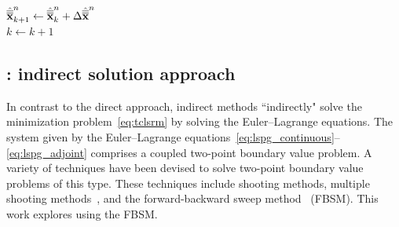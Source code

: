 \begin{algorithm}
{$\hat{\overline{\overline{\mathbf {x}}}}^{n}_{k+1} \leftarrow \hat{\overline{\overline{\mathbf {x}}}}^{n}_k + \Delta \hat{\overline{\overline{\mathbf {x}}}}^{n}$  \\
$k\leftarrow k+1$
}
\end{algorithm}


%

\subsection{\spatialAcronym: indirect solution approach}\label{sec:indirect}
In contrast to the direct approach,
indirect methods ``indirectly" solve the minimization
problem~\eqref{eq:tclsrm} by solving the Euler--Lagrange equations. The
system given by the Euler--Lagrange equations~\eqref{eq:lspg_continuous}--\eqref{eq:lspg_adjoint} comprises a coupled two-point boundary value
problem. A variety of techniques have
been devised to solve two-point boundary value problems of this type. These
techniques include shooting methods, multiple shooting
methods~\cite{multiple_shooting}, and the forward-backward sweep
method~\cite{fbs} (FBSM).  This work explores using the FBSM. 


